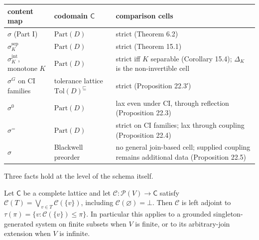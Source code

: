 {\def\LTcaptype{none} %
\begin{longtable}[]{@{}
  >{\raggedright\arraybackslash}p{}
  >{\raggedright\arraybackslash}p{}
  >{\raggedright\arraybackslash}p{}@{}}
\toprule\noalign{}
\begin{minipage}[b]{\linewidth}\raggedright
content map
\end{minipage} & \begin{minipage}[b]{\linewidth}\raggedright
codomain \(\mathsf{C}\)
\end{minipage} & \begin{minipage}[b]{\linewidth}\raggedright
comparison cells
\end{minipage} \\
\midrule\noalign{}
\endhead
\bottomrule\noalign{}
\endlastfoot
\(\sigma\) (Part I) & \(\mathrm{Part}(D)\) & strict (Theorem 6.2) \\
\(\sigma^{\mathrm{sep}}_K\) & \(\mathrm{Part}(D)\) & strict (Theorem 15.1) \\
\(\sigma^{\mathrm{jnt}}_K\), monotone \(K\) & \(\mathrm{Part}(D)\) & strict iff \(K\) separable (Corollary 15.4); \(\Delta_K\) is the non-invertible cell \\
\(\sigma^{G}\) on CI families & tolerance lattice \(\mathrm{Tol}(D)^{\sqsubseteq}\) & strict (Proposition 22.3′) \\
\(\sigma^{0}\) & \(\mathrm{Part}(D)\) & lax even under CI, through reflection (Proposition 22.3) \\
\(\sigma^{=}\) & \(\mathrm{Part}(D)\) & strict on CI families; lax through coupling (Proposition 22.4) \\
\(\widehat{\sigma}\) & Blackwell preorder & no general join-based cell; supplied coupling remains additional data (Proposition 22.5) \\
\end{longtable}
}

Three facts hold at the level of the schema itself.

\begin{thmplain}

Let \(\mathsf C\) be a complete lattice and let \(\mathcal C:\mathcal P(V)\to\mathsf C\) satisfy \(\mathcal C(T)=\bigvee_{v\in T}\mathcal C(\{v\})\), including \(\mathcal C(\varnothing)=\bot\). Then \(\mathcal C\) is left adjoint to \(\tau(\pi)=\{v:\mathcal C(\{v\})\le\pi\}\). In particular this applies to a grounded singleton-generated system on finite subsets when \(V\) is finite, or to its arbitrary-join extension when \(V\) is infinite.
\end{thmplain}

